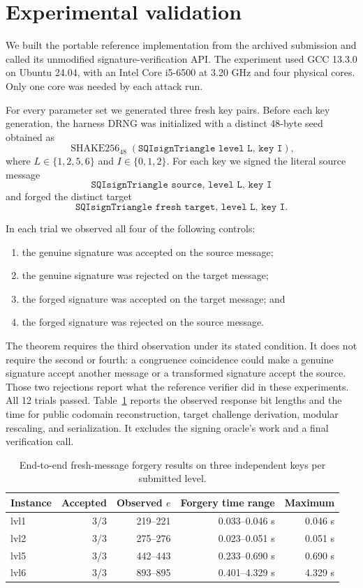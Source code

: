 \documentclass[11pt,a4paper]{article}
\begin{document}
\section{Experimental validation}

We built the portable reference implementation from the archived submission
and called its unmodified signature-verification API. The experiment used GCC
13.3.0 on Ubuntu 24.04, with an Intel Core i5-6500 at 3.20 GHz and four physical
cores. Only one core was needed by each attack run.

For every parameter set we generated three fresh key pairs. Before each key
generation, the harness DRNG was initialized with a distinct 48-byte seed
obtained as
\[
 \operatorname{SHAKE256}_{48}(\texttt{SQIsignTriangle level L, key I}),
\]
where $L\in\{1,2,5,6\}$ and $I\in\{0,1,2\}$. For each key we signed the literal
source message
\[
 \texttt{SQIsignTriangle source, level L, key I}
\]
and forged the distinct target
\[
 \texttt{SQIsignTriangle fresh target, level L, key I}.
\]

In each trial we observed all four of the following controls:
\begin{enumerate}[leftmargin=2em]
  \item the genuine signature was accepted on the source message;
  \item the genuine signature was rejected on the target message;
  \item the forged signature was accepted on the target message; and
  \item the forged signature was rejected on the source message.
\end{enumerate}
The theorem requires the third observation under its stated condition. It
does not require the second or fourth: a congruence coincidence could make a
genuine signature accept another message or a transformed signature accept
the source. Those two rejections report what the reference verifier did in
these experiments. All 12 trials passed. Table~\ref{tab:results} reports the observed response
bit lengths and the time for public codomain reconstruction, target challenge
derivation, modular rescaling, and serialization. It excludes the signing
oracle's work and a final verification call.

\begin{table}[t]
\centering
\caption{End-to-end fresh-message forgery results on three independent keys
per submitted level.}
\label{tab:results}
\begin{tabular}{@{}lrrrr@{}}
\toprule
Instance & Accepted & Observed $e$ & Forgery time range & Maximum \\
\midrule
lvl1 & 3/3 & 219--221 & 0.033--0.046 s & 0.046 s \\
lvl2 & 3/3 & 275--276 & 0.023--0.051 s & 0.051 s \\
lvl5 & 3/3 & 442--443 & 0.233--0.690 s & 0.690 s \\
lvl6 & 3/3 & 893--895 & 0.401--4.329 s & 4.329 s \\
\bottomrule
\end{tabular}
\end{table}
\end{document}
